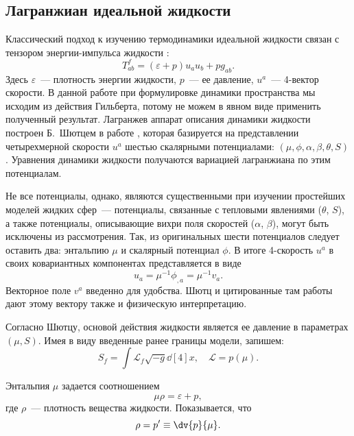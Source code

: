 \documentclass[\docroot/reports/draft/report.tex]{subfiles}
\begin{document}
\onlyinsubfile{\tableofcontents}

\subsection{Лагранжиан идеальной жидкости}

    Классический подход к изучению термодинамики идеальной жидкости связан с тензором энергии-импульса жидкости \cite{tolman}:
    \begin{equation*}
        T^f_{ab} = (\varepsilon + p) u_a u_b + p g_{ab} .
    \end{equation*}
    Здесь $\varepsilon$~--- плотность энергии жидкости, $p$~--- ее давление, $u^a$~--- 4-вектор скорости. В данной работе при формулировке динамики пространства мы исходим из действия Гильберта, потому не можем в явном виде применить полученный результат. Лагранжев аппарат описания динамики жидкости построен Б.~Шютцем в работе \cite{schutz_vel_pot}, которая базируется на представлении четырехмерной скорости $u^a$ шестью скалярными потенциалами: $(\mu,\phi,\alpha,\beta,\theta,S)$. Уравнения динамики жидкости получаются вариацией лагранжиана по этим потенциалам.

    Не все потенциалы, однако, являются существенными при изучении простейших моделей жидких сфер~--- потенциалы, связанные с тепловыми явлениями ($\theta$, $S$), а также потенциалы, описывающие вихри поля скоростей ($\alpha$, $\beta$), могут быть исключены из рассмотрения. Так, из оригинальных шести потенциалов следует оставить два: энтальпию $\mu$ и скалярный потенциал $\phi$. В итоге 4-скорость $u^a$ в своих ковариантных компонентах представляется в виде
    \begin{equation*}
        u_a = \mu^{-1} \phi_{,a} = \mu^{-1} v_a .
    \end{equation*}
    Векторное поле $v^a$ введенно для удобства. Шютц \cite{schutz_vel_pot} и цитированные там работы дают этому вектору также и физическую интерпретацию.

    Согласно Шютцу, основой действия жидкости является ее давление в параметрах $(\mu,S)$. Имея в виду введенные ранее границы модели, запишем:
    \begin{equation}
        S_f = \int \mathcal{L}_f \sqrt{-g} \dd[4]{x} , \quad
        \mathcal{L} = p(\mu) .
    \end{equation}

    Энтальпия $\mu$ задается соотношением
    \begin{equation*}
        \mu\rho = \varepsilon + p ,
    \end{equation*}
    где $\rho$~--- плотность вещества жидкости. Показывается, что
    \begin{equation*}
        \rho = p' \equiv \dv{p}{\mu} .
    \end{equation*}
\end{document}
